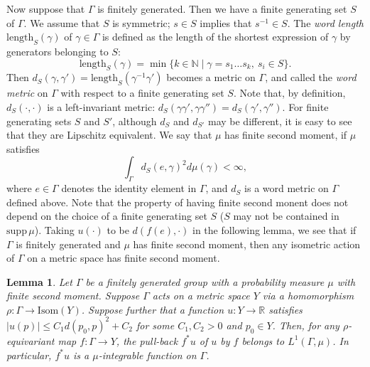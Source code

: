 \documentclass[12pt]{amsart}
\numberwithin{equation}{section}
\theoremstyle{plain}
\newtheorem{Lemma}[Theorem]{Lemma}
\theoremstyle{definition}
\theoremstyle{remark}
\newcommand{\R}{{\mathbb R}}
\newcommand{\N}{{\mathbb N}}
\newcommand{\isom}[1]{\mathrm{Isom}({#1})}
\newcommand{\supp}{\mathrm{supp}\,}
\begin{document}
Now suppose that $\Gamma$ is finitely generated.
Then we have a finite generating set $S$ of $\Gamma$.  
We assume that $S$ is symmetric; $s \in S$ implies that $s^{-1}\in S$. 
The {\it word length} $\mathrm{length}_S(\gamma)$ of $\gamma \in \Gamma$
is defined as the length of the shortest expression of $\gamma$ by
generators belonging to $S$:
\begin{equation*}
 \mathrm{length}_S(\gamma)= \min \{ k \in \N \mid \gamma=s_1 \dots s_k,\
  s_i \in S\}. 
\end{equation*}
Then $d_S(\gamma, \gamma')=\mathrm{length}_S(\gamma^{-1}\gamma')$
becomes a metric on $\Gamma$, and called the {\it word metric} on
$\Gamma$ with respect to a finite generating set $S$. 
Note that, by definition, $d_S(\cdot,\cdot)$ is a left-invariant metric: 
$d_S(\gamma \gamma', \gamma \gamma'')=d_S(\gamma',\gamma'')$.  
For finite generating sets $S$ and $S'$, although $d_S$ and $d_{S'}$ may
be different, it is easy to see that they are Lipschitz equivalent. 
We say that $\mu$ has finite second moment, if $\mu$ satisfies 
\begin{equation*}
 \int_{\Gamma} d_S(e,\gamma)^2 d\mu(\gamma) < \infty, 
\end{equation*}
where $e \in \Gamma$ denotes the identity element in $\Gamma$, and 
$d_S$ is a word metric on $\Gamma$ defined above. 
Note that the property of having finite second monent does not depend on
the choice of a finite generating set $S$ ($S$ may not be contained in
$\supp\mu$).  
Taking $u(\cdot)$ to be $d(f(e),\cdot)$ in the following lemma,  
we see that if $\Gamma$ is finitely generated and 
$\mu$ has finite second moment, then any isometric action of $\Gamma$ on
a metric space has finite second moment.

\begin{Lemma}
 \label{lem:integral}
 Let $\Gamma$ be a finitely generated group with a probability measure
 $\mu$ with finite second moment. Suppose $\Gamma$ acts on a metric
 space $Y$ via a homomorphism $\rho\colon \Gamma\rightarrow \isom{Y}$. 
 Suppose further that a function $u\colon Y \rightarrow \R$ satisfies 
 $|u(p)| \leq C_1 d(p_0,p)^2 + C_2$ for some $C_1,C_2>0$ and 
 $p_0 \in Y$. Then, for any $\rho$-equivariant map 
 $f\colon \Gamma \rightarrow Y$, the pull-back $f^*u$ of $u$ by $f$
 belongs to $L^1(\Gamma,\mu)$.  
 In particular, $f^*u$ is a $\mu$-integrable function on $\Gamma$. 
\end{Lemma}
\end{document}
